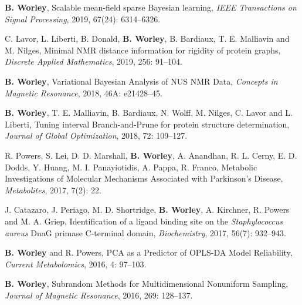 \documentclass[letterpaper]{article}
\renewenvironment{itemize}{
  \begin{list}{}{
    \setlength{\leftmargin}{1.5em}
  }
}{
  \end{list}
}
\begin{document}
\begin{itemize}
%

 \item \textbf{B. Worley},
  Scalable mean-field sparse Bayesian learning,
  \emph{IEEE Transactions on Signal Processing},
  2019, 67(24): 6314--6326.

 \item C. Lavor, L. Liberti, B. Donald, \textbf{B. Worley},
  B. Bardiaux, T. E. Malliavin and M. Nilges, Minimal NMR distance
  information for rigidity of protein graphs,
  \emph{Discrete Applied Mathematics},
  2019, 256: 91--104.

 \item \textbf{B. Worley},
  Variational Bayesian Analysis of NUS NMR Data,
  \emph{Concepts in Magnetic Resonance},
  2018, 46A: e21428--45.

 \item \textbf{B. Worley}, T. E. Malliavin, B. Bardiaux, N. Wolff,
  M. Nilges, C. Lavor and L. Liberti, Tuning interval Branch-and-Prune
  for protein structure determination,
  \emph{Journal of Global Optimization},
  2018, 72: 109--127.

 \item R. Powers, S. Lei, D. D. Marshall, \textbf{B. Worley}, A. Anandhan,
  R. L. Cerny, E. D. Dodds, Y. Huang, M. I. Panayiotidis, A. Pappa,
  R. Franco, Metabolic Investigations of Molecular Mechanisms
  Associated with Parkinson's Disease,
  \emph{Metabolites},
  2017, 7(2): 22.

 \item J. Catazaro, J. Periago, M. D. Shortridge, \textbf{B. Worley},
  A. Kirchner, R. Powers and M. A. Griep,
  Identification of a ligand binding site on the
  \emph{Staphylococcus aureus} DnaG primase C-terminal domain,
  \emph{Biochemistry}, 2017, 56(7): 932--943.

 \item \textbf{B. Worley} and R. Powers,
  PCA as a Predictor of OPLS-DA Model Reliability,
  \emph{Current Metabolomics},
  2016, 4: 97--103.

 \item \textbf{B. Worley},
  Subrandom Methods for Multidimensional Nonuniform Sampling,
  \emph{Journal of Magnetic Resonance},
  2016, 269: 128--137.


\end{itemize}
\end{document}
